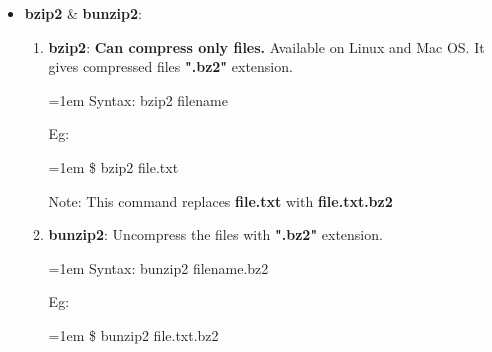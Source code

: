 \begin{flushleft}
\begin{itemize}
		\newpage
		\item \textbf{bzip2} \& \textbf{bunzip2}:
		\begin{enumerate}
			\item \textbf{bzip2}: \textbf{Can compress only files.} Available on Linux and Mac OS.  It gives compressed files \textbf{".bz2"} extension.
			\begin{tcolorbox}[breakable,notitle,boxrule=0pt,colback=pink,colframe=pink]
				\color{black}
				\font=1em
				Syntax: bzip2 filename
				\font=4pt
			\end{tcolorbox}
			Eg:
			\begin{tcolorbox}[breakable,notitle,boxrule=-0pt,colback=black,colframe=black]
				\color{green}
				\font=1em
				\$ bzip2 file.txt
				\font=4pt
			\end{tcolorbox}
			\begin{tcolorbox}[breakable,notitle,boxrule=0pt,colback=yellow,colframe=yellow]
				\color{black}
				Note: This command replaces \textbf{file.txt} with \textbf{file.txt.bz2}
			\end{tcolorbox}
			
			\bigskip\bigskip
			\item \textbf{bunzip2}: Uncompress the files with \textbf{".bz2"} extension.
			\begin{tcolorbox}[breakable,notitle,boxrule=0pt,colback=pink,colframe=pink]
				\color{black}
				\font=1em
				Syntax: bunzip2 filename.bz2
				\font=4pt
			\end{tcolorbox}
			Eg:
			\begin{tcolorbox}[breakable,notitle,boxrule=-0pt,colback=black,colframe=black]
				\color{green}
				\font=1em
				\$ bunzip2 file.txt.bz2
				\font=4pt
			\end{tcolorbox}		
		\end{enumerate}		
		
		\newpage
		

\end{itemize}
\end{flushleft}
